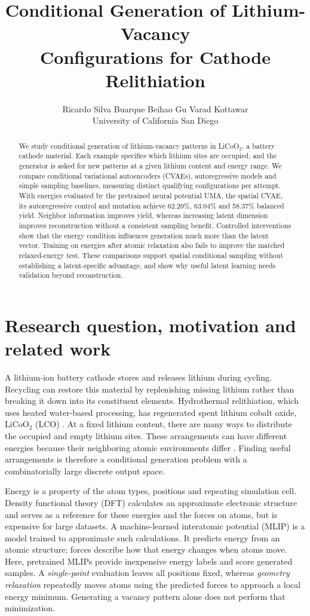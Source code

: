 \documentclass{article}
\title{Conditional Generation of Lithium-Vacancy\\Configurations for Cathode Relithiation}
\author{Ricardo Silva Buarque \quad Beihao Gu \quad Varad Kottawar\\
University of California San Diego}
\begin{document}
\maketitle
\begin{abstract}
We study conditional generation of lithium-vacancy patterns in LiCoO$_2$, a
battery cathode material. Each example specifies which lithium sites are
occupied, and the generator is asked for new patterns at a given lithium
content and energy range. We compare conditional variational autoencoders
(CVAEs), autoregressive models and simple sampling baselines, measuring distinct
qualifying configurations per attempt. With energies evaluated by the pretrained
neural potential UMA, the spatial CVAE, its autoregressive control and mutation
achieve 62.20\%, 63.04\% and 58.37\% balanced yield. Neighbor information improves
yield, whereas increasing latent dimension improves reconstruction without a
consistent sampling benefit. Controlled interventions show that the energy
condition influences generation much more than the latent vector. Training on
energies after atomic relaxation also fails to improve the matched relaxed-energy
test. These comparisons support spatial conditional sampling without establishing
a latent-specific advantage, and show why useful latent learning needs
validation beyond reconstruction.
\end{abstract}

\section{Research question, motivation and related work}
A lithium-ion battery cathode stores and releases lithium during cycling.
Recycling can restore this material by replenishing missing lithium rather than
breaking it down into its constituent elements. Hydrothermal relithiation,
which uses heated water-based processing, has regenerated spent lithium cobalt
oxide, LiCoO$_2$ (LCO) \citep{shi2018}. At a fixed lithium content, there are many
ways to distribute the occupied and empty lithium sites. These arrangements can
have different energies because their neighboring atomic environments differ
\citep{vanderVen1998}. Finding useful arrangements is therefore a conditional
generation problem with a combinatorially large discrete output space.

Energy is a property of the atom types, positions and repeating simulation cell.
Density functional theory (DFT) calculates an approximate electronic structure
and serves as a reference for these energies and the forces on atoms, but is
expensive for large datasets. A machine-learned interatomic potential (MLIP) is
a model trained to approximate such calculations. It predicts energy from an
atomic structure; forces describe how that energy changes when atoms move.
Here, pretrained MLIPs provide inexpensive energy labels and score generated
samples. A \emph{single-point} evaluation leaves all positions fixed, whereas
\emph{geometry relaxation} repeatedly moves atoms using the predicted forces to
approach a local energy minimum. Generating a vacancy pattern alone does not
perform that minimization.
\end{document}
